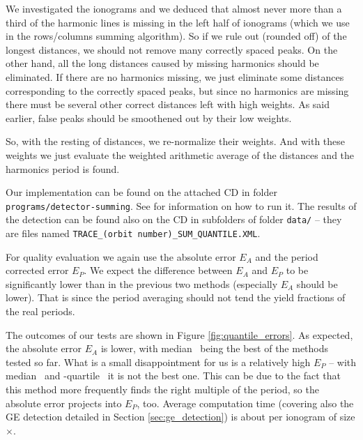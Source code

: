 We investigated the ionograms and we deduced that almost never more than a third of the harmonic lines is missing in the left half of ionograms (which we use in the rows/columns summing algorithm). So if we rule out (rounded off)  of the longest distances, we should not remove many correctly spaced peaks. On the other hand, all the long distances caused by missing harmonics should be eliminated. If there are no harmonics missing, we just eliminate some distances corresponding to the correctly spaced peaks, but since no harmonics are missing there must be several other correct distances left with high weights. As said earlier, false peaks should be smoothened out by their low weights.

So, with the resting  of distances, we re-normalize their weights. And with these weights we just evaluate the weighted arithmetic average of the distances and the harmonics period is found. 

Our implementation can be found on the attached CD in folder \texttt{programs/detector-summing}. See  for information on how to run it. The results of the detection can be found also on the CD in subfolders of folder \texttt{data/} -- they are files named \texttt{TRACE\_(orbit number)\_SUM\_QUANTILE.XML}.

For quality evaluation we again use the absolute error $E_A$ and the period corrected error $E_P$. We expect the difference between $E_A$ and $E_P$ to be significantly lower than in the previous two methods (especially $E_A$ should be lower). That is since the period averaging should not tend the yield fractions of the real periods.   

The outcomes of our tests are shown in Figure \ref{fig:quantile_errors}. As expected, the absolute error $E_A$ is lower, with median~ being the best of the methods tested so far. What is a small disappointment for us is a relatively high $E_P$ -- with median~ and \mbox{}-quartile~ it is not the best one. This can be due to the fact that this method more frequently finds the right multiple of the period, so the absolute error projects into $E_P$, too. Average computation time (covering also the GE detection detailed in Section \ref{sec:ge_detection}) is about  per ionogram of size $\times$.

